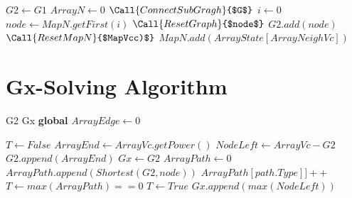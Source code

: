 \documentclass[AMA,STIX1COL]{WileyNJD-v2}
\begin{document}
\begin{appendix}
\begin{CJK*}{UTF8}{gkai}
\begin{algorithm}
\begin{algorithmic}[1]
                \State $G2\gets G1$
                \State $ArrayN\gets 0$
                \State $\Call{ConnectSubGragh}{$G$} $
	        \State $i\gets 0$
                    \State $node \gets MapN.getFirst(i)$
                    \State $\Call{ResetGraph}{$node$}$
                    \State $G2.add(node)$
                    \State $\Call{ResetMapN}{$MapVcc)$}$
                \EndWhile
                 \State {}
            \EndFunction
				\State $MapN.add(ArrayState[ArrayNeighVc])$
			\EndIf
		\EndFor            
            \EndFunction
        \end{algorithmic}
    \end{algorithm}
    \end{CJK*}
\newpage
    
\section{Gx-Solving Algorithm}  
 \begin{algorithm}
        \begin{algorithmic}[1] %
            \Require G2
            \Ensure Gx
            \State \textbf{global} $ArrayEdge\gets 0$

               \State $T\gets False$
                \State $ArrayEnd\gets ArrayVc.getPower()$
                 \State $NodeLeft\gets ArrayVc - G2$
                 \State $G2.append(ArrayEnd)$
                 \State $Gx \gets G2$
                     	\State $ArrayPath\gets 0$
                    	\State $ArrayPath.append(Shortest(G2, node))$
	 	  \EndFor
					\State $ArrayPath[path.Type]]++$
				 \EndIf
		   	\EndFor
		\EndIf
 		\State $ T \gets  max(ArrayPath) == 0$
                        $ T \gets True $
		\EndIf
                      \State $ Gx.append(max(NodeLeft)) $
		\EndIf
                \EndWhile
                 \State {}
            \EndFunction
        \end{algorithmic}
    \end{algorithm}
\end{appendix} 
\end{document}
